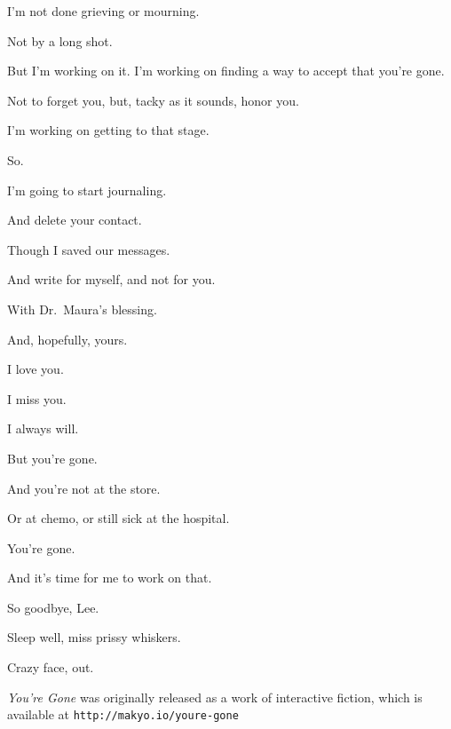 { I'm not done grieving or mourning.

 Not by a long shot.

 But I'm working on it. I'm working on finding a way to accept that you're gone.

 Not to forget you, but, tacky as it sounds, honor you.

 I'm working on getting to that stage.

 So.

 I'm going to start journaling.

 And delete your contact.

 Though I saved our messages.

 And write for myself, and not for you.

 With Dr.~Maura's blessing.

 And, hopefully, yours.

 I love you.

 I miss you.

 I always will.

 But you're gone.

 And you're not at the store.

 Or at chemo, or still sick at the hospital.

 You're gone.

 And it's time for me to work on that.

 So goodbye, Lee.

 Sleep well, miss prissy whiskers.

 Crazy face, out.

} %

\vfill

\begin{center}
    \emph{You're Gone} was originally released as a work of interactive fiction, which is available at \texttt{http://makyo.io/youre-gone}
\end{center}

\vfill
